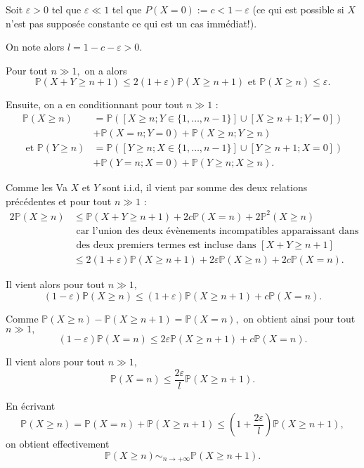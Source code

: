 \begin{enumerate}
Soit $\varepsilon>0$ tel que $\varepsilon\ll1$ tel que $\displaystyle P(X=0):=c<1-\varepsilon$ (ce qui est possible si $X$ n'est pas supposée constante ce qui est un cas immédiat!).

On note alors $\displaystyle l=1-c-\varepsilon>0.$

Pour tout $n\gg1,$ on a alors $$\mathbb{P}(X+Y\geq n+1)\leq 2(1+\varepsilon)\mathbb{P}(X\geq n+1) \mbox{ et } \mathbb{P}(X\geq n)\leq \varepsilon.$$ 

Ensuite, on a en conditionnant pour tout $n\gg1$ :
\begin{align*}
\mathbb{P}(X\geq n) & =\mathbb{P}([X\geq n;Y\in\{1,\ldots,n-1\}]\cup[X\geq n+1;Y=0])\\
& +\mathbb{P}(X=n;Y=0)+\mathbb{P}(X\geq n;Y\geq n)\\
\mbox{ et } \mathbb{P}(Y\geq n) & =\mathbb{P}([Y\geq n;X\in\{1,\ldots,n-1\}]\cup[Y\geq n+1;X=0])\\
& +\mathbb{P}(Y=n;X=0)+\mathbb{P}(Y\geq n;X\geq n).
\end{align*}

Comme les Va $X$ et $Y$ sont i.i.d, il vient par somme des deux relations précédentes et pour tout $n\gg1$ :
\begin{align*}
2\mathbb{P}(X\geq n) & \leq \mathbb{P}(X+Y\geq n+1)+2c\mathbb{P}(X=n)+2\mathbb{P}^{2}(X\geq n)\\
& \mbox{ car l'union des deux évènements incompatibles apparaissant dans chacun }\\
& \mbox{ des deux premiers termes est incluse dans } [X+Y\geq n+1]\\ 
&\leq 2(1+\varepsilon)\mathbb{P}(X\geq n+1) +2\varepsilon \mathbb{P}(X\geq n)+2c\mathbb{P}(X=n).
\end{align*}

Il vient alors pour tout $n\gg 1,$ $$ (1-\varepsilon)\mathbb{P}(X\geq n)\leq (1+\varepsilon)\mathbb{P}(X\geq n+1)+c\mathbb{P}(X=n).$$

Comme $\displaystyle \mathbb{P}(X\geq n)-\mathbb{P}(X\geq n+1)=\mathbb{P}(X=n),$ on obtient ainsi pour tout $n\gg1,$ $$ (1-\varepsilon)\mathbb{P}(X=n)\leq 2\varepsilon\mathbb{P}(X\geq n+1)+c\mathbb{P}(X=n).$$

Il vient alors pour tout $n\gg 1,$ $$ \mathbb{P}(X=n)\leq \frac{2\varepsilon}{l}\mathbb{P}(X\geq n+1).$$

En écrivant $$\mathbb{P}(X\geq n)=\mathbb{P}(X=n)+\mathbb{P}(X\geq n+1)\leq \left(1+\frac{2\varepsilon}{l}\right)\mathbb{P}(X\geq n+1),$$ on obtient effectivement $$\mathbb{P}(X\geq n)\sim_{n\rightarrow +\infty} \mathbb{P}(X\geq n+1).$$
\end{enumerate}

